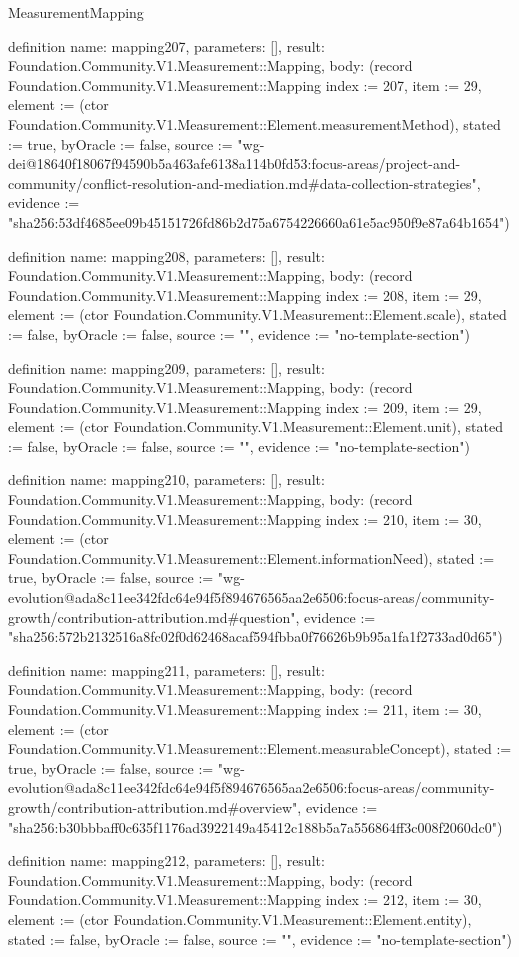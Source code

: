 \begin{lexlean}{MeasurementMapping}
\begin{semanticmodule}
definition{
  name: mapping207,
  parameters: [],
  result: Foundation.Community.V1.Measurement::Mapping,
  body: (record Foundation.Community.V1.Measurement::Mapping {index := 207, item := 29, element := (ctor Foundation.Community.V1.Measurement::Element.measurementMethod), stated := true, byOracle := false, source := "wg-dei@18640f18067f94590b5a463afe6138a114b0fd53:focus-areas/project-and-community/conflict-resolution-and-mediation.md#data-collection-strategies", evidence := "sha256:53df4685ee09b45151726fd86b2d75a6754226660a61e5ac950f9e87a64b1654"})
}

definition{
  name: mapping208,
  parameters: [],
  result: Foundation.Community.V1.Measurement::Mapping,
  body: (record Foundation.Community.V1.Measurement::Mapping {index := 208, item := 29, element := (ctor Foundation.Community.V1.Measurement::Element.scale), stated := false, byOracle := false, source := "", evidence := "no-template-section"})
}

definition{
  name: mapping209,
  parameters: [],
  result: Foundation.Community.V1.Measurement::Mapping,
  body: (record Foundation.Community.V1.Measurement::Mapping {index := 209, item := 29, element := (ctor Foundation.Community.V1.Measurement::Element.unit), stated := false, byOracle := false, source := "", evidence := "no-template-section"})
}

definition{
  name: mapping210,
  parameters: [],
  result: Foundation.Community.V1.Measurement::Mapping,
  body: (record Foundation.Community.V1.Measurement::Mapping {index := 210, item := 30, element := (ctor Foundation.Community.V1.Measurement::Element.informationNeed), stated := true, byOracle := false, source := "wg-evolution@ada8c11ee342fdc64e94f5f894676565aa2e6506:focus-areas/community-growth/contribution-attribution.md#question", evidence := "sha256:572b2132516a8fc02f0d62468acaf594fbba0f76626b9b95a1fa1f2733ad0d65"})
}

definition{
  name: mapping211,
  parameters: [],
  result: Foundation.Community.V1.Measurement::Mapping,
  body: (record Foundation.Community.V1.Measurement::Mapping {index := 211, item := 30, element := (ctor Foundation.Community.V1.Measurement::Element.measurableConcept), stated := true, byOracle := false, source := "wg-evolution@ada8c11ee342fdc64e94f5f894676565aa2e6506:focus-areas/community-growth/contribution-attribution.md#overview", evidence := "sha256:b30bbbaff0c635f1176ad3922149a45412c188b5a7a556864ff3c008f2060dc0"})
}

definition{
  name: mapping212,
  parameters: [],
  result: Foundation.Community.V1.Measurement::Mapping,
  body: (record Foundation.Community.V1.Measurement::Mapping {index := 212, item := 30, element := (ctor Foundation.Community.V1.Measurement::Element.entity), stated := false, byOracle := false, source := "", evidence := "no-template-section"})
}


\end{semanticmodule}
\end{lexlean}
